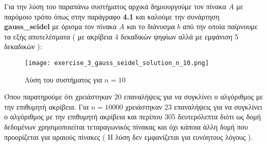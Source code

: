 \documentclass[First Project.tex]{subfiles}
\begin{document}
Για την λύση του παραπάνω συστήματος αρχικά δημιουργούμε τον πίνακα $Α$ με παρόμοιο τρόπο όπως στην παράγραφο \textbf{4.1} και καλούμε την 
συνάρτηση \textlatin{\textbf{gauss\_seidel}} με όρισμα τον πίνακα $Α$ και το διάνυσμα $b$ από την οποία παίρνουμε τα εξής αποτελέσματα ( με 
ακρίβεια 4 δεκαδικών ψηφίων αλλά με εμφάνιση 5 δεκαδικών ):
\begin{figure}[h!]
    \centering
    \captionsetup{justification=centering}
    \begin{center}
        \texttt{[image: exercise\_3\_gauss\_seidel\_solution\_n\_10.png]}    
        \caption{ Λύση του συστήματος για $n=10$ }
    \end{center}
\end{figure} 

Όπου παρατηρούμε ότι χρειάστηκαν 20 επαναλήψεις για να συγκλίνει ο αλγόριθμος με την επιθυμητή ακρίβεια. Για $n = 10000$ χρειάστηκαν 23 
επαναλήψεις για να συγκλίνει ο αλγόριθμος με την επιθυμητή ακρίβεια και περίπου 305 δευτερόλεπτα διότι ως δομή δεδομένων χρησιμοποιείται 
τεταραγωνικός πίνακας και όχι κάποια άλλη δομή που προορίζεται για αραιούς πίνακες ( Η λύση δεν εμφανίζεται για ευνόητους λόγους ).
\newpage
\end{document}
